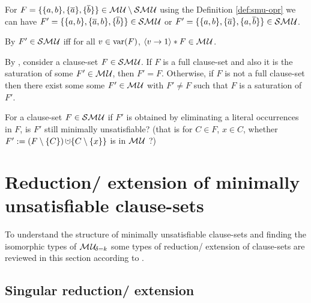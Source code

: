 \documentclass{report}
\begin{document}
\begin{examp}\label{exp:smu-exp}
 For $F = \{ \{ a,b \},\{ \overline{a} \},\{ \overline{b} \} \} \in \mathcal{M\hspace{0.8pt}U} \setminus \mathcal{S}\mathcal{M\hspace{0.8pt}U}$ using the Definition \ref{def:smu-opr} we can have $F'=\{ \{ a,b \},\{ \overline{a},b \},\{ \overline{b} \} \} \in \mathcal{S}\mathcal{M\hspace{0.8pt}U}$ or $F'=\{ \{ a,b \},\{ \overline{a} \},\{ a,\overline{b} \} \} \in \mathcal{S}\mathcal{M\hspace{0.8pt}U}$.
\end{examp}

\begin{lem}\label{lem:smu-mu}
By \cite{KullmannZhao2010Extremal}  $F' \in \mathcal{S}\mathcal{M\hspace{0.8pt}U}$ iff for all $v \in \operatorname{var}(F)$, $\langle v \rightarrow 1 \rangle*F \in \mathcal{M\hspace{0.8pt}U}$.
\end{lem}

\begin{lem}\label{lem:smu-app}
By \cite{KullmannZhao2010Extremal}, consider a clause-set $F \in \mathcal{S}\mathcal{M\hspace{0.8pt}U}$. If $F$ is a full clause-set and also it is the saturation of some $F' \in \mathcal{M\hspace{0.8pt}U}$, then $F' = F$. Otherwise, if $F$ is not a full clause-set then there exist some some $F' \in \mathcal{M\hspace{0.8pt}U}$ with $F' \not= F$ such that $F$ is a saturation of $F'$.
\end{lem}

\begin{quest}\label{que:smu-elim}
For a clause-set $F \in \mathcal{S}\mathcal{M\hspace{0.8pt}U}$ if $F'$ is obtained by eliminating a literal occurrences in $F$, is $F'$ still minimally unsatisfiable? (that is for $C \in F$, $x \in C$, whether $F' := (F \sm \set{C}) \addcup \set{C \sm \set{x}}$ is in $\mathcal{M\hspace{0.8pt}U}$ ?)
\end{quest}
\section{Reduction/ extension of minimally unsatisfiable clause-sets}
\label{sec:r-e}

To understand the structure of minimally unsatisfiable clause-sets and finding the isomorphic types of $\mathcal{M\hspace{0.8pt}U}_{\!\delta=k}$ some types of reduction/ extension of clause-sets are reviewed in this section according to \cite{KullmannZhao2010Extremal,KullmannZhao2012ConfluenceJ}.

\subsection{Singular reduction/ extension}
\label{sec:sing-re} 
\end{document}

